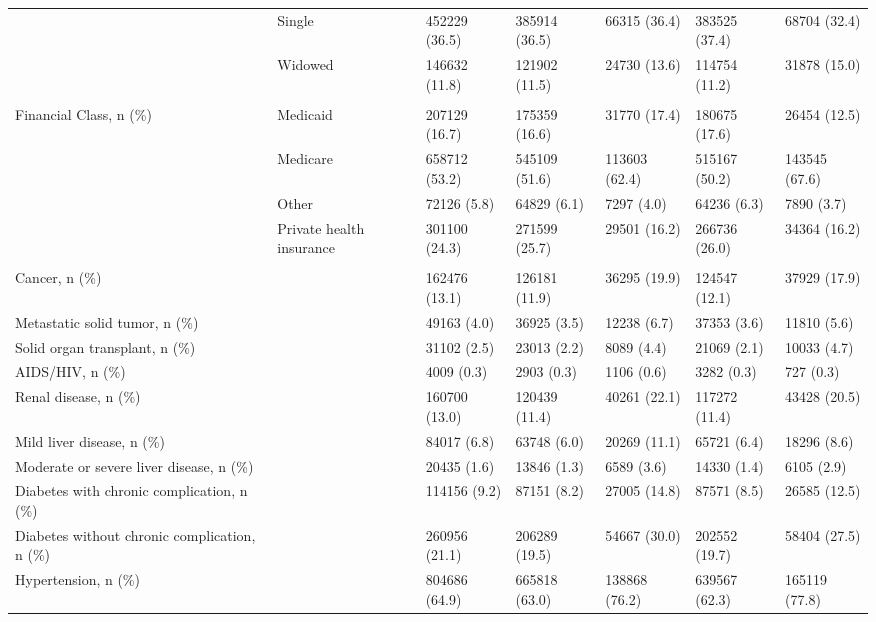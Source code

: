 \begin{adjustbox}{width={\textwidth},totalheight={\textheight},keepaspectratio,frame}
{\begin{tabular}{L{20em}C{10em}C{10em}C{10em}C{10em}C{10em}}
 & \hspace{3mm} Single & 452229 (36.5) & 385914 (36.5) & 66315 (36.4) & 383525 (37.4) & 68704 (32.4)\\
 & \hspace{3mm} Widowed & 146632 (11.8) & 121902 (11.5) & 24730 (13.6) & 114754 (11.2) & 31878 (15.0)\\
 &  &  &  &  &  & \\
Financial Class, n (\%) & \hspace{3mm} Medicaid & 207129 (16.7) & 175359 (16.6) & 31770 (17.4) & 180675 (17.6) & 26454 (12.5)\\
 & \hspace{3mm} Medicare & 658712 (53.2) & 545109 (51.6) & 113603 (62.4) & 515167 (50.2) & 143545 (67.6)\\
 & \hspace{3mm} Other & 72126 (5.8) & 64829 (6.1) & 7297 (4.0) & 64236 (6.3) & 7890 (3.7)\\
 & \hspace{3mm} Private health insurance & 301100 (24.3) & 271599 (25.7) & 29501 (16.2) & 266736 (26.0) & 34364 (16.2)\\
 &  &  &  &  &  & \\
Cancer, n (\%) &  & 162476 (13.1) & 126181 (11.9) & 36295 (19.9) & 124547 (12.1) & 37929 (17.9)\\
Metastatic solid tumor, n (\%) &  & 49163 (4.0) & 36925 (3.5) & 12238 (6.7) & 37353 (3.6) & 11810 (5.6)\\
Solid organ transplant, n (\%) &  & 31102 (2.5) & 23013 (2.2) & 8089 (4.4) & 21069 (2.1) & 10033 (4.7)\\
AIDS/HIV, n (\%) &  & 4009 (0.3) & 2903 (0.3) & 1106 (0.6) & 3282 (0.3) & 727 (0.3)\\
Renal disease, n (\%) &  & 160700 (13.0) & 120439 (11.4) & 40261 (22.1) & 117272 (11.4) & 43428 (20.5)\\
Mild liver disease, n (\%) &  & 84017 (6.8) & 63748 (6.0) & 20269 (11.1) & 65721 (6.4) & 18296 (8.6)\\
Moderate or severe liver disease, n (\%) &  & 20435 (1.6) & 13846 (1.3) & 6589 (3.6) & 14330 (1.4) & 6105 (2.9)\\
Diabetes with chronic complication, n (\%) &  & 114156 (9.2) & 87151 (8.2) & 27005 (14.8) & 87571 (8.5) & 26585 (12.5)\\
Diabetes without chronic complication, n (\%) &  & 260956 (21.1) & 206289 (19.5) & 54667 (30.0) & 202552 (19.7) & 58404 (27.5)\\
Hypertension, n (\%) &  & 804686 (64.9) & 665818 (63.0) & 138868 (76.2) & 639567 (62.3) & 165119 (77.8)\\

\end{tabular}}
\end{adjustbox}
